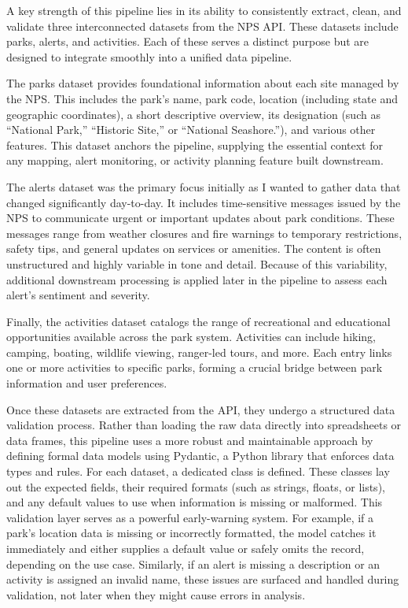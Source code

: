 \documentclass[
  letterpaper,
  DIV=11,
  numbers=noendperiod]{scrartcl}
\begin{document}
A key strength of this pipeline lies in its ability to consistently
extract, clean, and validate three interconnected datasets from the NPS
API. These datasets include parks, alerts, and activities. Each of these
serves a distinct purpose but are designed to integrate smoothly into a
unified data pipeline.

The parks dataset provides foundational information about each site
managed by the NPS. This includes the park's name, park code, location
(including state and geographic coordinates), a short descriptive
overview, its designation (such as ``National Park,'' ``Historic Site,''
or ``National Seashore.''), and various other features. This dataset
anchors the pipeline, supplying the essential context for any mapping,
alert monitoring, or activity planning feature built downstream.

The alerts dataset was the primary focus initially as I wanted to gather
data that changed significantly day-to-day. It includes time-sensitive
messages issued by the NPS to communicate urgent or important updates
about park conditions. These messages range from weather closures and
fire warnings to temporary restrictions, safety tips, and general
updates on services or amenities. The content is often unstructured and
highly variable in tone and detail. Because of this variability,
additional downstream processing is applied later in the pipeline to
assess each alert's sentiment and severity.

Finally, the activities dataset catalogs the range of recreational and
educational opportunities available across the park system. Activities
can include hiking, camping, boating, wildlife viewing, ranger-led
tours, and more. Each entry links one or more activities to specific
parks, forming a crucial bridge between park information and user
preferences.

Once these datasets are extracted from the API, they undergo a
structured data validation process. Rather than loading the raw data
directly into spreadsheets or data frames, this pipeline uses a more
robust and maintainable approach by defining formal data models using
Pydantic, a Python library that enforces data types and rules. For each
dataset, a dedicated class is defined. These classes lay out the
expected fields, their required formats (such as strings, floats, or
lists), and any default values to use when information is missing or
malformed. This validation layer serves as a powerful early-warning
system. For example, if a park's location data is missing or incorrectly
formatted, the model catches it immediately and either supplies a
default value or safely omits the record, depending on the use case.
Similarly, if an alert is missing a description or an activity is
assigned an invalid name, these issues are surfaced and handled during
validation, not later when they might cause errors in analysis.
\end{document}
